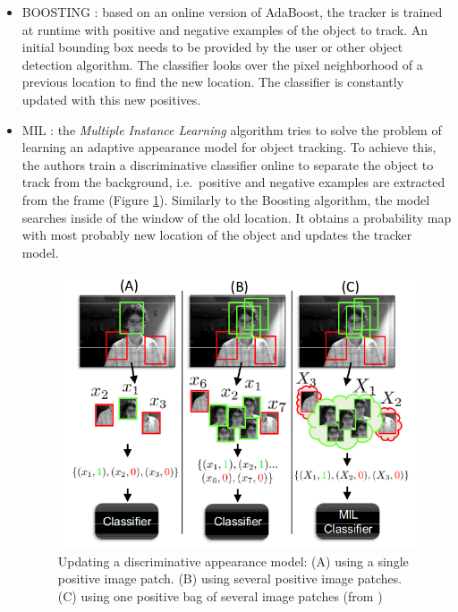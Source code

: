 \begin{itemize}
\item BOOSTING \cite{grabner2006real}: based on an online version of AdaBoost, the tracker is trained at runtime with positive and negative examples of the object to track. An initial bounding box needs to be provided by the user or other object detection algorithm. The classifier looks over the pixel neighborhood of a previous location to find the new location. The classifier is constantly updated with this new positives.
\item MIL \cite{babenko2009visual}: the \textit{Multiple Instance Learning} algorithm tries to solve the problem of learning an adaptive appearance model for object tracking. To achieve this, the authors train a discriminative classifier online to separate the object to track from the background, i.e.\ positive and negative examples are extracted from the frame (Figure \ref{fig:mil}). Similarly to the Boosting algorithm, the model searches inside of the window of the old location. It obtains a probability map with most probably new location of the object and updates the tracker model.
\begin{figure}[H]
\begin{center}
\includegraphics[scale=0.4]{figures/mil.png}
\caption{Updating a discriminative appearance model: (A) using a single positive image patch. (B) using several positive image patches. (C) using one positive bag of several image patches (from \cite{babenko2009visual})}
\label{fig:mil}
\end{center}
\end{figure}

\end{itemize}
